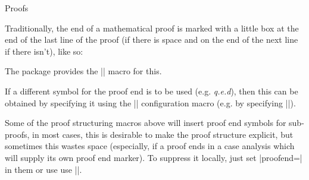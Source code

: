 \begin{sfragment}{Proofs}
\begin{function}{\sproofend}
  Traditionally, the end of a mathematical proof is marked with a little box at the end of
  the last line of the proof (if there is space and on the end of the next line if there
  isn't), like so:\sproofend

  The  package provides the |\sproofend| macro for this.
\end{function}
  
\begin{variable}{\sProofEndSymbol}
  If a different symbol for the proof end is to be used (e.g. {\sl{q.e.d}}), then this can
  be obtained by specifying it using the |\sProofEndSymbol| configuration macro (e.g. by
  specifying ||).
\end{variable}
  
Some of the proof structuring macros above will insert proof end symbols for sub-proofs,
in most cases, this is desirable to make the proof structure explicit, but sometimes this
wastes space (especially, if a proof ends in a case analysis which will supply its own
proof end marker). To suppress it locally, just set |proofend={}| in them or use use
|\sProofEndSymbol{}|.
\end{sfragment}



